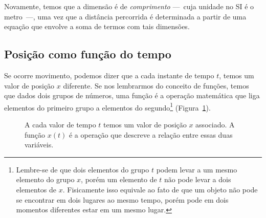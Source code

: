 Novamente, temos que a dimensão é de \emph{comprimento} ---~cuja unidade no SI é o metro~---, uma vez que a distância percorrida é determinada a partir de uma equação que envolve a soma de termos com tais dimensões.


\subsection{Posição como função do tempo}

Se ocorre movimento, podemos dizer que a cada instante de tempo $t$, temos um valor de posição $x$ diferente. Se nos lembrarmos do conceito de funções, temos que dados dois grupos de números, uma função é a operação matemática que liga elementos do primeiro grupo a elementos do segundo\footnote[][-4cm]{Lembre-se de que dois elementos do grupo $t$ podem levar a um mesmo elemento do grupo $x$, porém um elemento de $t$ não pode levar a dois elementos de $x$. Fisicamente isso equivale ao fato de que um objeto não pode se encontrar em dois lugares ao mesmo tempo, porém pode em dois momentos diferentes estar em um mesmo lugar.} (Figura~\ref{Fig:DefFuncaoPosicaoDoTempo}).
\begin{figure}\forcerectofloat
\centering
{}
\caption{A cada valor de tempo $t$ temos um valor de posição $x$ associado. A função $x(t)$ é a operação que descreve a relação entre essas duas variáveis.\label{Fig:DefFuncaoPosicaoDoTempo}}
\end{figure}

